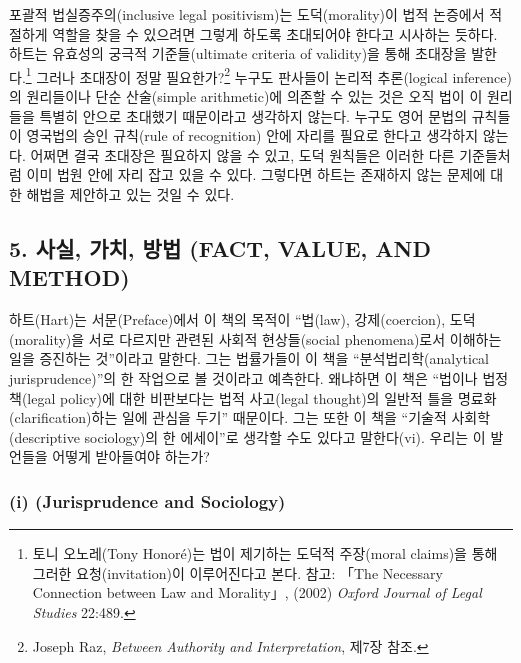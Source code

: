 포괄적 법실증주의(inclusive legal positivism)는 도덕(morality)이 법적
논증에서 적절하게 역할을 찾을 수 있으려면 그렇게 하도록 초대되어야
한다고 시사하는 듯하다. 하트는 유효성의 궁극적 기준들(ultimate criteria
of validity)을 통해 초대장을 발한다.\footnote{토니 오노레(Tony Honoré)는
  법이 제기하는 도덕적 주장(moral claims)을 통해 그러한
  요청(invitation)이 이루어진다고 본다. 참고: 「The Necessary Connection
  between Law and Morality」, (2002) \emph{Oxford Journal of Legal
  Studies} 22:489.} 그러나 초대장이 정말 필요한가?\footnote{Joseph Raz,
  \emph{Between Authority and Interpretation}, 제7장 참조.} 누구도
판사들이 논리적 추론(logical inference)의 원리들이나 단순 산술(simple
arithmetic)에 의존할 수 있는 것은 오직 법이 이 원리들을 특별히 안으로
초대했기 때문이라고 생각하지 않는다. 누구도 영어 문법의 규칙들이
영국법의 승인 규칙(rule of recognition) 안에 자리를 필요로 한다고
생각하지 않는다. 어쩌면 결국 초대장은 필요하지 않을 수 있고, 도덕
원칙들은 이러한 다른 기준들처럼 이미 법원 안에 자리 잡고 있을 수 있다.
그렇다면 하트는 존재하지 않는 문제에 대한 해법을 제안하고 있는 것일 수
있다.

\subsection{5. 사실, 가치, 방법 (FACT, VALUE, AND
METHOD)}\label{uxc0acuxc2e4-uxac00uxce58-uxbc29uxbc95-fact-value-and-method}

하트(Hart)는 서문(Preface)에서 이 책의 목적이 “법(law), 강제(coercion),
도덕(morality)을 서로 다르지만 관련된 사회적 현상들(social
phenomena)로서 이해하는 일을 증진하는 것”이라고 말한다. 그는 법률가들이
이 책을 “분석법리학(analytical jurisprudence)”의 한 작업으로 볼
것이라고 예측한다. 왜냐하면 이 책은 “법이나 법정책(legal policy)에 대한
비판보다는 법적 사고(legal thought)의 일반적 틀을
명료화(clarification)하는 일에 관심을 두기” 때문이다. 그는 또한 이 책을
“기술적 사회학(descriptive sociology)의 한 에세이”로 생각할 수도
있다고 말한다(vi). 우리는 이 발언들을 어떻게 받아들여야 하는가?

\subsubsection{\texorpdfstring{(i)  (Jurisprudence
and
Sociology)}{(i) 법리학과 사회학 (Jurisprudence and Sociology)}}\label{i-uxbc95uxb9acuxd559uxacfc-uxc0acuxd68cuxd559-jurisprudence-and-sociology}

